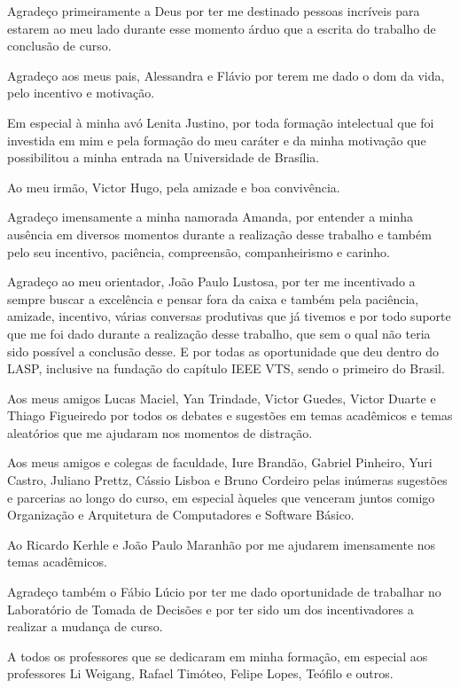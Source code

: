 Agradeço primeiramente a Deus por ter me destinado pessoas incríveis para estarem ao meu lado 
durante esse momento árduo que a escrita do trabalho de conclusão de curso. 

Agradeço aos meus pais, Alessandra e Flávio por terem me dado o dom da vida, pelo incentivo e motivação.

Em especial à minha avó Lenita Justino, por toda formação 
intelectual que foi investida em mim e pela formação do meu caráter e da minha motivação que possibilitou 
a minha entrada na Universidade de Brasília.

Ao meu irmão, Victor Hugo, pela amizade e boa convivência.

Agradeço imensamente a minha namorada Amanda, por entender a minha ausência em diversos momentos durante a realização desse trabalho
e também pelo seu incentivo, paciência, compreensão, companheirismo e carinho.

Agradeço ao meu orientador, João Paulo Lustosa, por ter me incentivado a sempre buscar a excelência e pensar fora da caixa e também
pela paciência, amizade, incentivo, várias conversas produtivas que já tivemos e por todo suporte que me foi dado durante a realização desse 
trabalho, que sem o qual não teria sido possível a conclusão desse. E por todas as oportunidade que deu dentro do LASP, inclusive na fundação 
do capítulo IEEE VTS, sendo o primeiro do Brasil.

Aos meus amigos Lucas Maciel, Yan Trindade, Victor Guedes, Victor Duarte e Thiago Figueiredo por todos os debates e sugestões em temas acadêmicos 
e temas aleatórios que me ajudaram nos momentos de distração.

Aos meus amigos e colegas de faculdade, Iure Brandão, Gabriel Pinheiro, Yuri Castro, Juliano Prettz, Cássio Lisboa e 
Bruno Cordeiro pelas inúmeras sugestões e parcerias ao longo do curso, em especial àqueles que venceram juntos comigo Organização e Arquitetura
de Computadores e Software Básico.

Ao Ricardo Kerhle e João Paulo Maranhão por me ajudarem imensamente nos temas acadêmicos. 

Agradeço também o Fábio Lúcio por ter me dado oportunidade de trabalhar no Laboratório de Tomada de Decisões e por ter sido um
dos incentivadores a realizar a mudança de curso.

A todos os professores que se dedicaram em minha formação, em especial aos professores Li Weigang, Rafael Timóteo, Felipe Lopes, Teófilo e outros.

